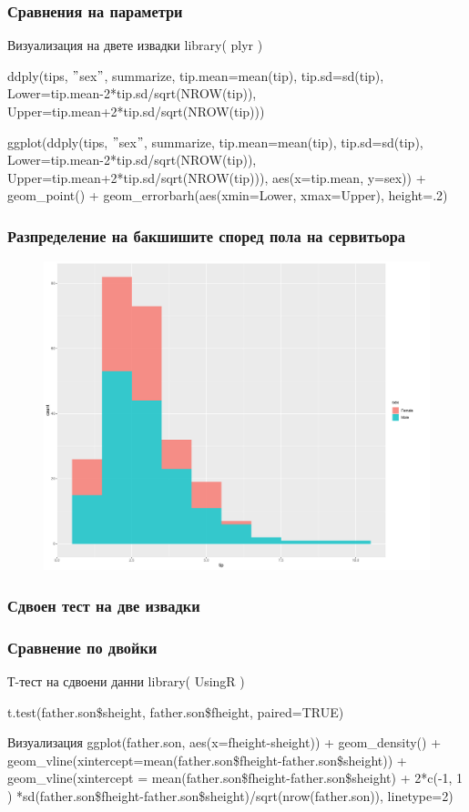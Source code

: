 \documentclass{beamer}
\begin{document}
\begin{frame}
\frametitle{Сравнения на параметри}
\begin{block}{Визуализация на двете извадки}
library( plyr )

ddply(tips, $"$sex$"$, summarize, tip.mean=mean(tip), tip.sd=sd(tip), Lower=tip.mean-2*tip.sd/sqrt(NROW(tip)), Upper=tip.mean+2*tip.sd/sqrt(NROW(tip))) 

ggplot(ddply(tips, $"$sex$"$, summarize, tip.mean=mean(tip), tip.sd=sd(tip), Lower=tip.mean-2*tip.sd/sqrt(NROW(tip)), Upper=tip.mean+2*tip.sd/sqrt(NROW(tip))), aes(x=tip.mean, y=sex)) + geom\_point() + geom\_errorbarh(aes(xmin=Lower, xmax=Upper), height=.2)
\end{block}
\end{frame}

\begin{frame}
\frametitle{Разпределение на бакшишите според пола на сервитьора}
\begin{figure}[]\includegraphics[width=\textwidth,height=0.75\textheight]{pic0057}\end{figure}
\end{frame}

\subsubsection{Сдвоен тест на две извадки}

\begin{frame}
\frametitle{Сравнение по двойки}
\begin{block}{Т-тест на сдвоени данни}
library( UsingR )

t.test(father.son\$sheight, father.son\$fheight, paired=TRUE)
\end{block}

\begin{block}{Визуализация}
ggplot(father.son, aes(x=fheight-sheight)) + geom\_density() + geom\_vline(xintercept=mean(father.son\$fheight-father.son\$sheight)) + geom\_vline(xintercept = mean(father.son\$fheight-father.son\$sheight) + 2*c(-1, 1 ) *sd(father.son\$fheight-father.son\$sheight)/sqrt(nrow(father.son)), linetype=2)
\end{block}
\end{frame}
\end{document}
